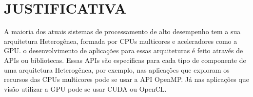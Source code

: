 
\chapter{JUSTIFICATIVA}
\label{chap:justificativa}

A maioria dos atuais sistemas de processamento de alto desempenho tem a sua arquitetura Heterogênea, formada por CPUs multicores e aceleradores como a GPU. o desenvolvimento de aplicações para essas arquiteturas é feito através de APIs ou bibliotecas. Essas APIs são específicas para cada tipo de componente de uma arquitetura Heterogênea, por exemplo, nas aplicações que exploram os recursos das CPUs multicores pode se usar a API OpenMP. Já nas aplicações que visão utilizar a GPU pode se usar CUDA ou OpenCL.